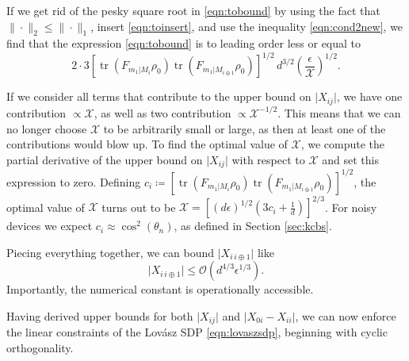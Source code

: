 If we get rid of the pesky square root in \ref{eqn:tobound} by using the fact that $\|\cdot\|_2\leq \|\cdot\|_1$, insert \ref{eqn:toinsert}, and use the inequality \ref{eqn:cond2new}, we find that the expression \ref{eqn:tobound} is to leading order less or equal to
\begin{equation}
2\cdot3\left[\operatorname{tr}(F_{m_1\vert M_i}\rho_0)\operatorname{tr}(F_{m_1\vert M_{i\oplus 1}}\rho_0)\right]^{1/2}\,d^{3/2}\left(\frac{\epsilon}{\mathcal{X}}\right)^{1/2}.
\end{equation}

If we consider all terms that contribute to the upper bound on $\vert X_{ij} \vert$, we have one contribution $\propto \mathcal{X}$, as well as two contribution $\propto \mathcal{X}^{-1/2}$. This means that we can no longer choose $\mathcal{X}$ to be arbitrarily small or large, as then at least one of the contributions would blow up. To find the optimal value of $\mathcal{X}$, we compute the partial derivative of the upper bound on $\vert X_{ij}\vert$ with respect to $\mathcal{X}$ and set this expression to zero. Defining $ c_i \coloneqq \left[\operatorname{tr}(F_{m_1\vert M_i}\rho_0)\operatorname{tr}(F_{m_1\vert M_{i\oplus 1}}\rho_0)\right]^{1/2}$, the optimal value of $\mathcal{X}$ turns out to be $\mathcal{X}=\left[(d\epsilon)^{1/2}(3c_i +\frac{1}{d})\right]^{2/3}$. For noisy devices we expect $c_i\approx \cos^2(\theta_n)$, as defined in Section \ref{sec:kcbs}. 

Piecing everything together, we can bound $\vert X_{i\,i\oplus 1} \vert$ like
\begin{equation}
\vert X_{i\,i\oplus 1} \vert \leq \mathcal{O}\left(d^{4/3}\epsilon^{1/3}\right).
\end{equation}
Importantly, the numerical constant is operationally accessible.

Having derived upper bounds for both $\vert X_{ij} \vert$ and $\vert X_{0i}-X_{ii}\vert$, we can now enforce the linear constraints of the Lovász SDP \ref{eqn:lovaszsdp}, beginning with cyclic orthogonality.

